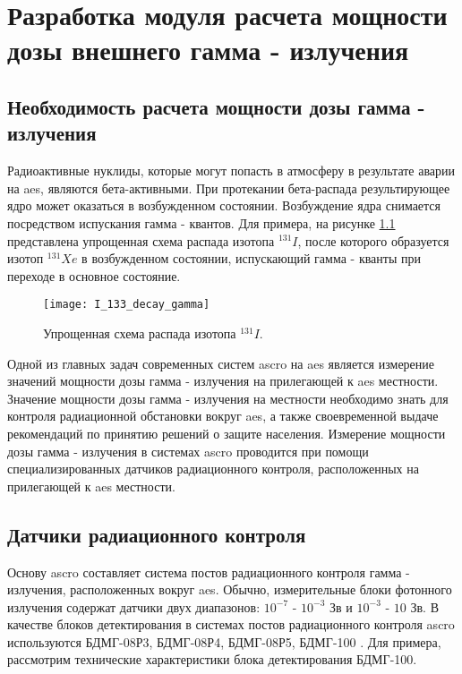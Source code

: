 \chapter{Разработка модуля расчета мощности дозы внешнего гамма - излучения}
\label{chapter_dose}

\section{Необходимость расчета мощности дозы гамма - излучения}
\label{sec_gamma_theory}

Радиоактивные нуклиды, которые могут попасть в атмосферу в результате аварии на \ac{aes}, являются бета-активными. При 
протекании бета-распада результирующее ядро может оказаться в возбужденном состоянии. Возбуждение ядра снимается 
посредством испускания гамма - квантов. Для примера, на рисунке \ref{fig_I_133_decay_gamma} представлена упрощенная схема 
распада изотопа $^{131}I$, после которого образуется изотоп $^{131}Xe$ в возбужденном состоянии, испускающий 
гамма - кванты при переходе в основное состояние.

\begin{figure}[ht!]
    \centering
    \texttt{[image: I\_133\_decay\_gamma]}
    \captionsetup{justification=centering}
    \caption{Упрощенная схема распада изотопа $^{131}I$.}
    \label{fig_I_133_decay_gamma}
\end{figure}

Одной из главных задач современных систем \ac{ascro} на \ac{aes} является измерение значений мощности дозы 
гамма - излучения на прилегающей к \ac{aes} местности. Значение мощности дозы гамма - излучения на местности необходимо знать 
для контроля радиационной обстановки вокруг \ac{aes}, а также своевременной выдаче рекомендаций по принятию решений о 
защите населения. Измерение мощности дозы гамма - излучения в системах \ac{ascro} проводится при помощи 
специализированных датчиков радиационного контроля, расположенных на прилегающей к \ac{aes} местности. 

\section{Датчики радиационного контроля}

Основу \ac{ascro} составляет система постов радиационного контроля гамма - излучения, расположенных вокруг \ac{aes}. 
Обычно, измерительные блоки фотонного излучения содержат датчики двух диапазонов: $10^{-7}$ - $10^{-3}$ Зв и $10^{-3}$ 
- $10$ Зв. В качестве блоков детектирования в системах постов радиационного контроля \ac{ascro} используются БДМГ-08Р3, 
БДМГ-08Р4, БДМГ-08Р5, БДМГ-100 \cite{elokhin}. Для примера, рассмотрим технические характеристики блока детектирования 
БДМГ-100.

